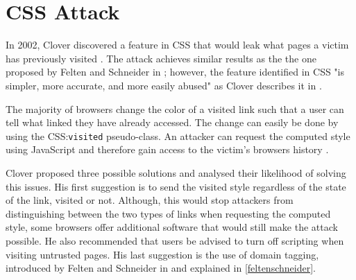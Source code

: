\documentclass[10pt,a4paper,twoside]{book}
\begin{document}


\section{CSS Attack}

In 2002, Clover discovered a feature in CSS that would leak what pages a victim has previously visited \cite{cssvisited}. The attack achieves similar results as the the one proposed by Felten and Schneider in \cite{felten2000timing}; however, the feature identified in CSS 
"is simpler, more accurate, and more easily abused" as Clover describes it in \cite{cssvisited}.

The majority of browsers change the color of a visited link such that a user can tell what linked they have already accessed. The change can easily be done by using the CSS:\texttt{visited} pseudo-class. An attacker can request the computed style using JavaScript and therefore gain access to the victim's browsers history \cite{cssvisited}.

Clover proposed three possible solutions and analysed their likelihood of solving this issues. His first suggestion is to send the visited style regardless of the state of the link, visited or not. Although, this would stop attackers from distinguishing between the two types of links when requesting the computed style, some browsers offer additional software that would still make the attack possible. He also recommended that users be advised to turn off scripting when visiting untrusted pages. His last suggestion is the use of domain tagging, introduced by Felten and Schneider in \cite{felten2000timing} and explained in \ref{feltenschneider}.
\end{document}

